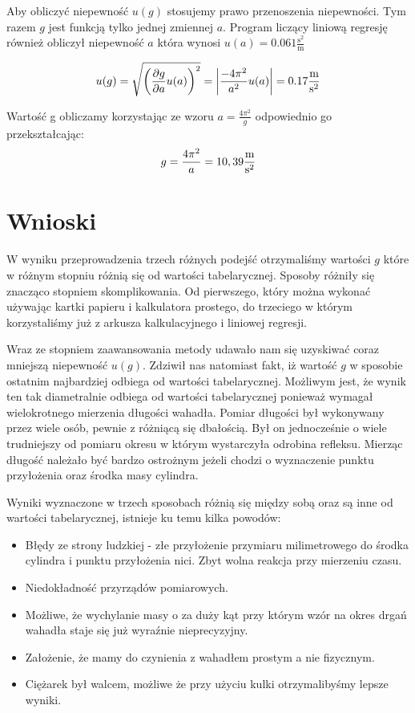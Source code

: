 \documentclass{fizykalab}
\begin{document}
Aby obliczyć niepewność $u(g)$ stosujemy prawo przenoszenia niepewności.
Tym razem $g$ jest funkcją tylko jednej zmiennej $a$. Program liczący liniową regresję również 
obliczył niepewność $a$ która wynosi $u(a) = 0.061 \frac{\text{s}^2} {\text{m}}$


\begin{equation*}
    u(g) = \sqrt{\left(\frac{\partial g}{\partial a}u(a)\right)^2} = \left|\frac{-4\pi^2}{a^2}u(a)\right| = 0.17 \frac{\text{m}}{\text{s}^2}
\end{equation*}


Wartość g obliczamy korzystając ze wzoru $a=\frac{4\pi^2}{g}$ odpowiednio go przekształcając:
\begin{equation*}
    g = \frac{4\pi^2}{a} = 10,39 \frac{\text{m}}{\text{s}^2}
\end{equation*}

\section{Wnioski}
W wyniku przeprowadzenia trzech różnych podejść otrzymaliśmy wartości $g$ które
w różnym stopniu różnią się od wartości tabelarycznej. Sposoby różniły się znacząco
stopniem skomplikowania. Od pierwszego, który można wykonać używając kartki
papieru i kalkulatora prostego, do trzeciego w którym korzystaliśmy już z
arkusza kalkulacyjnego i liniowej regresji. 

Wraz ze stopniem zaawansowania
metody udawało nam się uzyskiwać coraz mniejszą niepewność $u(g)$. Zdziwił nas
natomiast fakt, iż wartość $g$ w sposobie ostatnim najbardziej odbiega od
wartości tabelarycznej. Możliwym jest, że wynik ten tak diametralnie odbiega od
wartości tabelarycznej ponieważ wymagał wielokrotnego mierzenia długości
wahadła. Pomiar długości był wykonywany przez wiele osób, pewnie z różniącą się 
dbałością. Był on jednocześnie o wiele trudniejszy od pomiaru okresu w którym
wystarczyła odrobina refleksu. Mierząc długość należało być bardzo ostrożnym 
jeżeli chodzi o wyznaczenie punktu przyłożenia oraz środka masy cylindra.

Wyniki wyznaczone w trzech sposobach różnią się między sobą oraz są inne od
wartości tabelarycznej, istnieje ku temu kilka powodów:
\begin{itemize}
    \item Błędy ze strony ludzkiej - złe przyłożenie przymiaru 
    milimetrowego do środka cylindra i punktu przyłożenia nici.
    Zbyt wolna reakcja przy mierzeniu czasu.
    \item Niedokładność przyrządów pomiarowych.
    \item Możliwe, że wychylanie masy o za duży kąt przy którym wzór na okres drgań wahadła
          staje się już wyraźnie nieprecyzyjny. 
    \item Założenie, że mamy do czynienia z wahadłem prostym a nie fizycznym.
    \item Ciężarek był walcem, możliwe że przy użyciu kulki otrzymalibyśmy lepsze wyniki.
\end{itemize}



\renewcommand{\refname}{Bibliografia}


\end{document}
